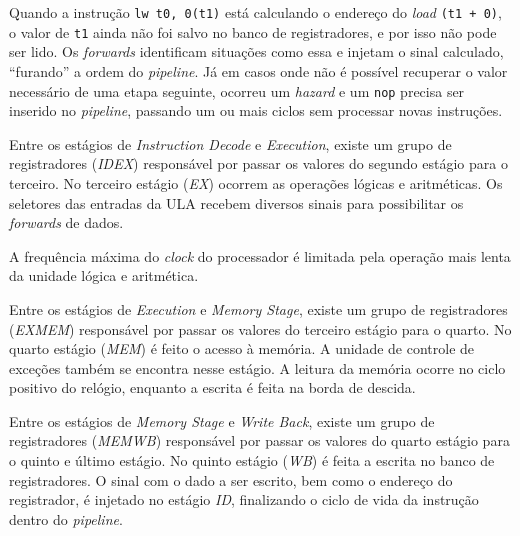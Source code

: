         { Quando a instrução \texttt{lw  t0, 0(t1)} está calculando o endereço
            do \textit{load} \texttt{(t1 + 0)}, o valor de \texttt{t1} ainda
            não foi salvo no banco de registradores, e por isso não pode ser
            lido. Os \textit{forwards} identificam situações como essa e injetam
            o sinal calculado, ``furando'' a ordem do \textit{pipeline}.
            Já em casos onde não é possível recuperar o valor necessário de uma
            etapa seguinte, ocorreu um \textit{hazard} e um \texttt{nop} precisa
            ser inserido no \textit{pipeline}, passando um ou mais ciclos sem
            processar novas instruções.
        }

        { Entre os estágios de \textit{Instruction Decode} e \textit{Execution},
            existe um grupo de registradores (\textit{IDEX}) responsável por passar
            os valores do segundo estágio para o terceiro. No terceiro estágio
            (\textit{EX}) ocorrem as operações lógicas e aritméticas.
            Os seletores das entradas da ULA recebem diversos sinais para
            possibilitar os \textit{forwards} de dados.
        }

        { A frequência máxima do \textit{clock} do processador é limitada pela
            operação mais lenta da unidade lógica e aritmética.
        }

        { Entre os estágios de \textit{Execution} e \textit{Memory Stage},
            existe um grupo de registradores (\textit{EXMEM}) responsável por passar
            os valores do terceiro estágio para o quarto. No quarto estágio
            (\textit{MEM}) é feito o acesso à memória. A unidade
            de controle de exceções também se encontra nesse estágio. A leitura
            da memória ocorre no ciclo positivo do relógio, enquanto a escrita
            é feita na borda de descida.
        }

        { Entre os estágios de \textit{Memory Stage} e \textit{Write Back},
            existe um grupo de registradores (\textit{MEMWB}) responsável por passar
            os valores do quarto estágio para o quinto e último estágio. No quinto
            estágio (\textit{WB}) é feita a escrita no banco de registradores.
            O sinal com o dado a ser escrito, bem como o endereço do registrador,
            é injetado no estágio \textit{ID}, finalizando o ciclo de vida da
            instrução dentro do \textit{pipeline}.
        }

